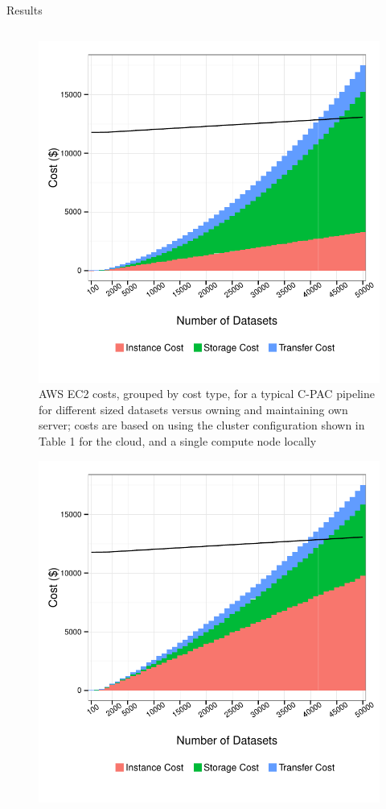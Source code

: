\documentclass[final,hyperref={pdfpagelabels=false}]{beamer}
\begin{document}
\begin{frame}
\begin{columns}
\begin{column}{.5\textwidth}
{\begin{block}{Results}
\begin{column}{.47\textwidth}
\begin{figure}
                  \includegraphics[width=.99\textwidth]{cpac-costs.pdf}
                  \caption{\label{fig:cpac-costs}AWS EC2 costs, grouped by cost type, for a typical C-PAC pipeline for different sized datasets versus owning and maintaining own server; costs are based on using the cluster configuration shown in Table 1 for the cloud, and a single compute node locally}
              \end{figure}
              \begin{figure}
                  \includegraphics[width=.99\textwidth]{fs-costs.pdf}

\end{figure}
\end{column}
\end{block}}
\end{column}
\end{columns}
\end{frame}
\end{document}
